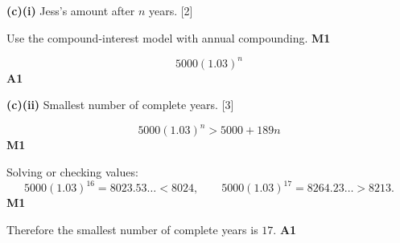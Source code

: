 \documentclass[12pt, twoside]{article}
\begin{document}
\begin{enumerate}[itemsep=0.35cm]
\medskip

\textbf{(c)(i)} Jess's amount after $n$ years. \hfill [2]

Use the compound-interest model with annual compounding. \hfill \textbf{M1}

\[
5000(1.03)^n
\]
\hfill \textbf{A1}

\medskip

\textbf{(c)(ii)} Smallest number of complete years. \hfill [3]

\[
5000(1.03)^n>5000+189n
\]
\hfill \textbf{M1}

Solving or checking values:
\[
5000(1.03)^{16}=8023.53\ldots<8024,
\qquad
5000(1.03)^{17}=8264.23\ldots>8213.
\]
\hfill \textbf{M1}

Therefore the smallest number of complete years is $17$. \hfill \textbf{A1}

\end{enumerate}
\end{document}
